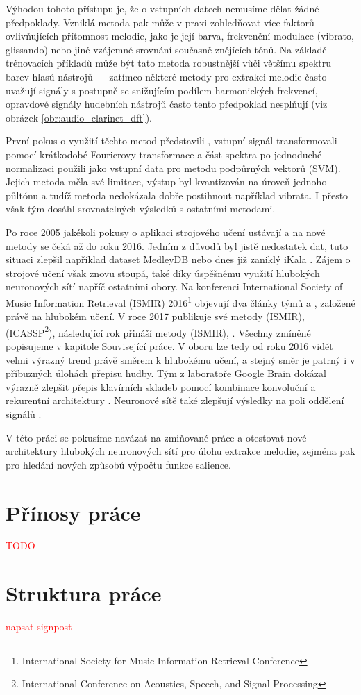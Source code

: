 Výhodou tohoto přístupu je, že o vstupních datech nemusíme dělat žádné předpoklady. Vzniklá metoda pak může v praxi zohledňovat více faktorů ovlivňujících přítomnost melodie, jako je její barva, frekvenční modulace (vibrato, glissando) nebo jiné vzájemné srovnání současně znějících tónů. Na základě trénovacích příkladů může být tato metoda robustnější vůči většímu spektru barev hlasů nástrojů --- zatímco některé metody pro extrakci melodie často uvažují signály s postupně se snižujícím podílem harmonických frekvencí, opravdové signály hudebních nástrojů často tento předpoklad nesplňují (viz obrázek \ref{obr:audio_clarinet_dft}).

První pokus o využití těchto metod představili \cite{Poliner}, vstupní signál transformovali pomocí krátkodobé Fourierovy transformace a část spektra po jednoduché normalizaci použili jako vstupní data pro metodu podpůrných vektorů (SVM). Jejich metoda měla své limitace, výstup byl kvantizován na úroveň jednoho půltónu a tudíž metoda nedokázala dobře postihnout například vibrata. I přesto však tým dosáhl srovnatelných výsledků s ostatními metodami. 

Po roce 2005 jakékoli pokusy o aplikaci strojového učení ustávají a na nové metody se čeká až do roku 2016. Jedním z důvodů byl jistě nedostatek dat, tuto situaci zlepšil například dataset MedleyDB \citep{Bittner2014} nebo dnes již zaniklý iKala \citep{Chan2015}. Zájem o strojové učení však znovu stoupá, také díky úspěšnému využití hlubokých neuronových sítí napříč ostatními obory. Na konferenci International Society of Music Information Retrieval (ISMIR) 2016\footnote{International Society for Music Information Retrieval Conference} objevují dva články týmů \cite{Kum2016} a \cite{Rigaud2016}, založené právě na hlubokém učení. V roce 2017 publikuje své metody \cite{Bittner2017} (ISMIR), \cite{Balke2017} (ICASSP\footnote{International Conference on Acoustics, Speech, and Signal Processing}), následující rok přináší metody \cite{DBasaranSEssid2018} (ISMIR), \cite{Bittner2018}. Všechny zmíněné popisujeme v kapitole \hyperref[chap:souvisejici]{Související práce}. V oboru lze tedy od roku 2016 vidět velmi výrazný trend právě směrem k hlubokému učení, a stejný směr je patrný i v příbuzných úlohách přepisu hudby. Tým z laboratoře Google Brain dokázal výrazně zlepšit přepis klavírních skladeb pomocí kombinace konvoluční a rekurentní architektury \citep{Hawthorne2018}. Neuronové sítě také zlepšují výsledky na poli oddělení signálů \citep{Stoller2018}.

V této práci se pokusíme navázat na zmiňované práce a otestovat nové architektury hlubokých neuronových sítí pro úlohu extrakce melodie, zejména pak pro hledání nových způsobů výpočtu funkce salience. %

\section{Přínosy práce}

\textcolor{red}{TODO}

\section{Struktura práce}

\textcolor{red}{napsat signpost}


